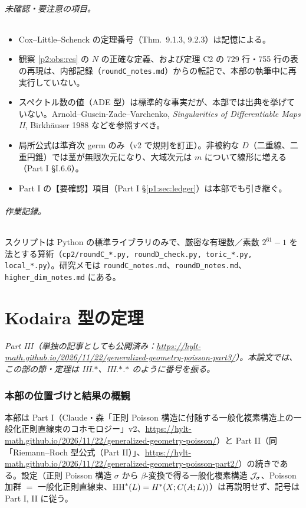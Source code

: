 \paragraph{未確認・要注意の項目。}
\begin{itemize}
\item Cox--Little--Schenck の定理番号（Thm.\ 9.1.3, 9.2.3）は記憶による。\tQ
\item 観察 \ref{p2:obs:res} の $N$ の正確な定義、および定理 C2 の 729 行・755 行の表の再現は、内部記録（\texttt{roundC\_notes.md}）からの転記で、本部の執筆中に再実行していない。\tQ
\item スペクトル数の値（ADE 型）は標準的な事実だが、本部では出典を挙げていない。Arnold--Gusein-Zade--Varchenko, \emph{Singularities of Differentiable Maps II}, Birkh\"auser 1988 などを参照すべき。\tQ
\item 局所公式は準斉次 germ のみ（v2 で規則を訂正）。非被約な $D$（二重線、二重円錐）では茎が無限次元になり、大域次元は $m$ について線形に増える（Part I \S I.6.6）。
\item Part I の【要確認】項目（Part I \S\ref{p1:sec:ledger}）は本部でも引き継ぐ。
\end{itemize}

\paragraph{作業記録。}スクリプトは Python の標準ライブラリのみで、厳密な有理数／素数 $2^{61}-1$ を法とする算術（\texttt{cp2/roundC\_*.py, roundD\_check.py, toric\_*.py, local\_*.py}）。研究メモは \texttt{roundC\_notes.md}、\texttt{roundD\_notes.md}、\texttt{higher\_dim\_notes.md} にある。




\clearpage
\part{Kodaira 型の定理}
\setcounter{section}{0}
\noindent\textit{Part III（単独の記事としても公開済み：\url{https://hylt-math.github.io/2026/11/22/generalized-geometry-poisson-part3/}）。本論文では、この部の節・定理は III.$\ast$、III.$\ast$.$\ast$ のように番号を振る。}\par
\section{本部の位置づけと結果の概観}\label{p3:sec:intro}
本部は Part I（Claude・森「正則 Poisson 構造に付随する一般化複素構造上の一般化正則直線束のコホモロジー」v2、\url{https://hylt-math.github.io/2026/11/22/generalized-geometry-poisson/}）と Part II（同「Riemann--Roch 型公式（Part II）」、\url{https://hylt-math.github.io/2026/11/22/generalized-geometry-poisson-part2/}）の続きである。設定（正則 Poisson 構造 $\sigma$ から $\beta$-変換で得る一般化複素構造 $\mathcal J_\sigma$、Poisson 加群 $=$ 一般化正則直線束、$\mathrm{HH}^*(L)=H^*(X;C(A;L))$）は再説明せず、記号は Part I, II に従う。

